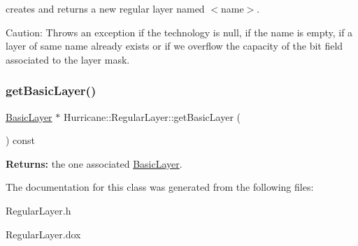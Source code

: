 creates and returns a new regular layer named {\ttfamily $<$name$>$}.

\begin{DoxyParagraph}{Caution\+: Throws an exception if the technology is null, if the name is }
empty, if a layer of same name already exists or if we overflow the capacity of the bit field associated to the layer mask. 
\end{DoxyParagraph}
\mbox{\label{classHurricane_1_1RegularLayer_a148c5839b544c2a0aa5d25be5958dfaf}} 
\subsubsection{\texorpdfstring{get\+Basic\+Layer()}{getBasicLayer()}}
{\footnotesize\ttfamily \mbox{\hyperlink{classHurricane_1_1BasicLayer}{Basic\+Layer}} $\ast$ Hurricane\+::\+Regular\+Layer\+::get\+Basic\+Layer (\begin{DoxyParamCaption}{ }\end{DoxyParamCaption}) const\hspace{0.3cm}{\ttfamily [inline]}}

{\bfseries Returns\+:} the one associated \mbox{\hyperlink{classHurricane_1_1BasicLayer}{Basic\+Layer}}. 

The documentation for this class was generated from the following files\+:\begin{DoxyCompactItemize}
\item 
Regular\+Layer.\+h\item 
Regular\+Layer.\+dox\end{DoxyCompactItemize}
